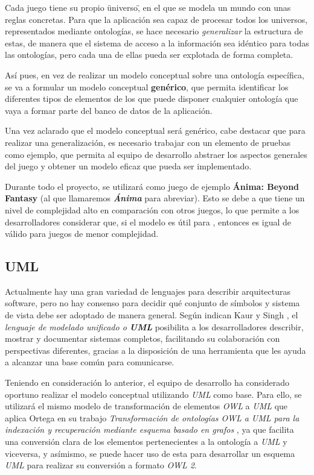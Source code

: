 Cada juego tiene su propio \"universo\", en el que se modela un mundo con unas reglas concretas. Para que la aplicación sea 
capaz de procesar todos los universos, representados mediante ontologías, se hace necesario \textit{generalizar} la 
estructura de estas, de manera que el sistema de acceso a la información sea idéntico para todas las ontologías, pero 
cada una de ellas pueda ser explotada de forma completa. \medskip

Así pues, en vez de realizar un modelo conceptual sobre una ontología específica, se va a formular un modelo 
conceptual \textbf{genérico}, que permita identificar los diferentes tipos de elementos de los que puede disponer 
cualquier ontología que vaya a formar parte del banco de datos de la aplicación. \medskip 

Una vez aclarado que el modelo conceptual será genérico, cabe destacar que para realizar una generalización, es necesario 
trabajar con un elemento de pruebas como ejemplo, que permita al equipo de desarrollo abstraer los aspectos generales del 
juego y obtener un modelo eficaz que pueda ser implementado. \medskip 

Durante todo el proyecto, se utilizará como juego de ejemplo \textbf{Ánima: Beyond Fantasy} (al que llamaremos \textit\textbf{{Ánima}} para abreviar). Esto se debe a
que tiene un nivel de complejidad alto en comparación con otros juegos, lo que permite a los desarrolladores considerar que, 
si el modelo es útil para \anima, entonces es igual de válido para juegos de menor complejidad. \medskip

\subsection{UML}
Actualmente hay una gran variedad de lenguajes para describir arquitecturas software, pero no hay consenso para decidir 
qué conjunto de símbolos y sistema de vista debe ser adoptado de manera general. Según indican Kaur y Singh \autocite{Kaur2015},
el \textit{lenguaje de modelado unificado o \textbf{UML}} posibilita a los desarrolladores describir, mostrar y documentar sistemas 
completos, facilitando su colaboración con perspectivas diferentes, gracias a la disposición de una herramienta que les ayuda 
a alcanzar una base común para comunicarse. \medskip

Teniendo en consideración lo anterior, el equipo de desarrollo ha considerado oportuno realizar el modelo conceptual 
utilizando \textit{UML} como base. Para ello, se utilizará el mismo modelo de transformación de elementos \textit{OWL} a 
\textit{UML} que aplica Ortega en su trabajo \textit{Transformación de ontologías OWL a UML para la indexación y recuperación
mediante esquema basado en grafos} \autocite*{Ortega2015}, ya que facilita una conversión clara de los elementos pertenecientes 
a la ontología a \textit{UML} y viceversa, y asímismo, se puede hacer uso de esta para desarrollar un esquema \textit{UML} para 
realizar su conversión a formato \textit{OWL 2}.

